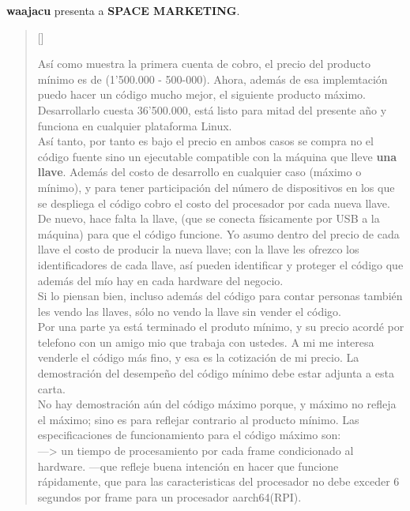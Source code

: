 \documentclass[11pt, a4paper]{article} %
\begin{document}
\textbf{waajacu} presenta a \textbf{SPACE MARKETING}.\\
\poemtitle{}

\settowidth{\versewidth}{DULCE DICHA OCULTA DE LOS QUE SE REBELAN SÓLOS } %

\begin{verse}[\versewidth]
{\scriptsize

Así como muestra la primera cuenta de cobro, 
el precio del producto mínimo es de 
(1'500.000 - 500-000). Ahora, además de esa implemtación 
puedo hacer un código mucho mejor, el siguiente producto máximo.\\

Desarrollarlo cuesta 36'500.000, está listo para mitad del presente año 
y funciona en cualquier plataforma Linux. \\

Así tanto, por tanto es bajo el precio en ambos casos se compra no el 
código fuente sino un ejecutable compatible con la máquina que lleve 
\textbf{una llave}. Además del costo de desarrollo en cualquier caso (máximo o mínimo), 
y para tener participación del número de dispositivos en los que se despliega 
el código cobro el costo del procesador por cada nueva llave. 
De nuevo, hace falta la llave, (que se conecta físicamente por USB a la máquina) 
para que el código funcione. Yo asumo dentro del precio de cada llave el costo de 
producir la nueva llave; con la llave les ofrezco los identificadores de cada 
llave, así pueden identificar y proteger el código que además del mío hay en 
cada hardware del negocio. \\

Si lo piensan bien, incluso además del código para contar personas también les vendo 
las llaves, sólo no vendo la llave sin vender el código. \\
Por una parte ya está terminado el produto mínimo, y su precio acordé por telefono con 
un amigo mio que trabaja con ustedes. A mi me interesa venderle el código más fino, 
y esa es la cotización de mi precio. La demostración del desempeño del código mínimo 
debe estar adjunta a esta carta. \\

No hay demostración aún del código máximo porque, y máximo no refleja el máximo; sino 
es para reflejar contrario al producto mínimo. Las especificaciones de funcionamiento 
para el código máximo son: \\

---> un tiempo de procesamiento por cada frame condicionado al hardware. ---que refleje 
buena intención en hacer que funcione rápidamente, que para las caracteristicas del 
procesador no debe exceder 6 segundos por frame para un procesador aarch64(RPI). \\

}
\end{verse}
\end{document}
